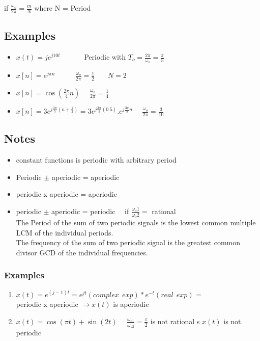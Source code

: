 \documentclass[11pt,a4paper]{article}
\theoremstyle{definition}
\begin{document}
    if $\frac{\omega_o}{2\pi} = \frac{m}{N}$ where N = Period 
    
\subsection{Examples}

\begin{itemize}
    \item  $x(t) = j e^{j10t}$ \ \ \ \ \ \ 
    Periodic with $T_o = \frac{2\pi}{\omega_o} = \frac{\pi}{5}$
   
   \item $ x[n] = e^{j\pi n}$  \ \ \ \ \ $\frac{\omega_o}{2\pi} = \frac{1}{2}$ \ \  \ $N = 2$ 
   
   \item $x[n] = \cos(\frac{2\pi}{4}n)$  \ \ $\frac{\omega_o}{2\pi} = 
        \frac{1}{4}$
    \item $x[n] = 3 e ^{j\frac{3\pi}{5}(n + \frac{1}{2})} = 3 e^{j\frac{3\pi}{5}(0.5)}. e^{j \frac{3\pi}{5}n}$ \  \ 
    $\frac{\omega_o}{2\pi} = \frac{3}{10}$
\end{itemize}
\subsection{Notes}
\begin{itemize}
    \item constant functions is periodic with arbitrary period
    \item Periodic $\pm$ aperiodic  = aperiodic 
    \item periodic x  aperiodic = aperiodic 
    \item periodic $\pm$  aperiodic = periodic  \ \ if $\frac{\omega _o1}{\omega_o 2} =$ rational \\
    
    The Period of the sum of two periodic signals is the lowest common
    multiple LCM of the individual periods. \\
    
    The frequency of the sum of two periodic signal is the greatest common divisor GCD of the individual frequencies. 

\end{itemize}
\subsubsection{Examples}

\begin{enumerate}
    \item $x(t) = e^{(j-1)t} = e^{jt}(complex \ \ exp) * e^{-t}(real  \  \ exp) $ = \\  periodic x aperiodic  $\longrightarrow x(t)$ is aperiodic 
    
    \item $x(t) = \cos(\pi t) + \sin(2t)$  \ \ $\frac{\omega_{o1}}{\omega_{o2}} = \frac{\pi}{2} $ is not rational s $x(t)$ is not periodic 
\end{enumerate}
\end{document}
